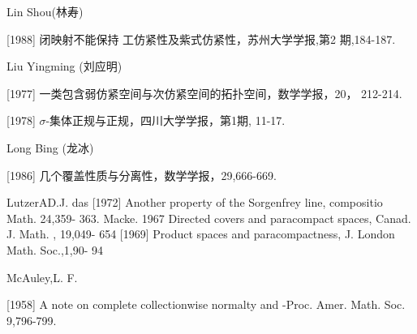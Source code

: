 \documentclass[main.tex]{subfiles}
\begin{document}
\noindent Lin Shou(林寿)

[1988] 闭映射不能保持 工仿紧性及紫式仿紧性，苏州大学学报,第2
期,184-187.

\noindent Liu Yingming (刘应明)

[1977] 一类包含弱仿紧空间与次仿紧空间的拓扑空间，数学学报，20，
212-214.

[1978] $\sigma$-集体正规与正规，四川大学学报，第1期, 11-17.


\noindent Long Bing (龙冰)

[1986] 几个覆盖性质与分离性，数学学报，29,666-669.

\noindent LutzerAD.J.
das [1972]
Another property of the Sorgenfrey line, compositio Math. 24,359-
363.
Macke.
1967 Directed covers and paracompact spaces, Canad. J. Math. , 19,049-
654
[1969] Product spaces and paracompactness, J. London Math. Soc.,1,90-
94

\noindent McAuley,L. F.

[1958]
A note on complete collectionwise normalty and
-Proc. Amer. Math. Soc. 9,796-799.
\end{document}
